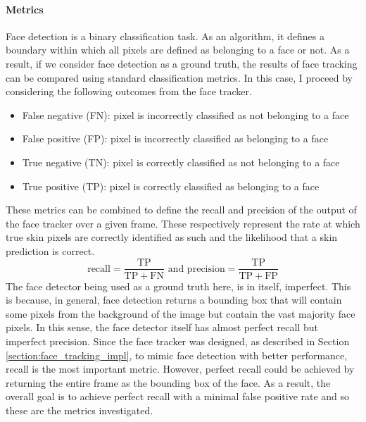 \paragraph{Metrics}
Face detection is a binary classification task. As an algorithm, it defines a boundary within which all pixels are defined as belonging to a face or not.
As a result, if we consider face detection as a ground truth, the results of face tracking can be compared using standard classification metrics. In this case, I proceed by considering the following outcomes from the face tracker.
\begin{itemize}
   \item False negative (FN): pixel is incorrectly classified as not belonging to a face
   \item False positive (FP): pixel is incorrectly classified as belonging to a face
   \item True negative (TN): pixel is correctly classified as not belonging to a face 
   \item True positive (TP): pixel is correctly classified as belonging to a face 
\end{itemize}
These metrics can be combined to define the recall and precision of the output of the face tracker over a given frame. These respectively represent the rate at which true skin pixels are correctly identified as such and the likelihood that a skin prediction is correct.
\begin{equation*}
    \mathrm{recall} = \frac{\mathrm{TP}}{\mathrm{TP} + \mathrm{FN}} \text{ and } \mathrm{precision} = \frac{\mathrm{TP}}{\mathrm{TP}+\mathrm{FP}}
\end{equation*}
The face detector being used as a ground truth here, is in itself, imperfect. This is because, in general, face detection returns a bounding box
that will contain some pixels from the background of the image but contain the vast majority face pixels. In this sense, the face detector itself has almost perfect recall but imperfect precision.
Since the face tracker was designed, as described in Section \ref{section:face_tracking_impl}, to mimic face detection with better performance, recall is the most important metric. However, perfect recall
could be achieved by returning the entire frame as the bounding box of the face. As a result, the overall goal is to achieve perfect recall with a minimal false positive rate and so these are the metrics investigated.

